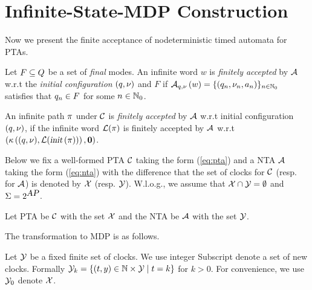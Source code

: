\section{Infinite-State-MDP Construction}

Now we present the finite acceptance of nodeterministic timed automata for PTAs.
\vspace{-0.8em}
\begin{definition}
Let $F\subseteq Q$ be a set of \emph{final} modes.
An infinite word $w$ is \emph{finitely accepted} by $\mathcal{A}$ w.r.t the \emph{initial configuration} $(q,\nu)$ and $F$ if ${\mathcal{A}}_{q,\nu}\left(w\right)=\{(q_n,\nu_n,a_n)\}_{n\in\mathbb{N}_0}$ satisfies that $q_n\in F$ for
some $n\in\mathbb{N}_0$.
\end{definition}

\begin{definition}
An infinite path $\pi$ under $\mathcal{C}$ is \emph{finitely accepted} by $\mathcal{A}$ w.r.t 
initial configuration $(q,\nu)$, if the infinite word $\mathcal{L}(\pi)$ is finitely
accepted by $\mathcal{A}$ w.r.t 
$
\left(\kappa\left((q,\nu), \mathcal{L}(\mbox{\sl init}\left(\pi\right))\right),\mathbf{0}\right)
$.
\end{definition}
% 
% 
Below we fix a well-formed PTA $\mathcal{C}$ taking the form (\ref{eq:pta}) and a NTA $\mathcal{A}$ taking the form (\ref{eq:nta}) with the difference that the set of clocks for $\mathcal{C}$ (resp. for $\mathcal{A}$) is denoted by $\mathcal{X}$ (resp. $\mathcal{Y}$).
W.l.o.g., we assume that $\mathcal{X} \cap \mathcal{Y} = \emptyset$ and $\Sigma=2^{\mbox{\sl AP}}$.

Let PTA be $\mathcal{C}$ with the set $\mathcal{X}$ and the NTA be $\mathcal{A}$ with the set $\mathcal{Y}$.

The transformation to MDP is as follows.

Let $\mathcal{Y}$ be a fixed finite set of clocks. We use integer Subscript denote a set of 
new clocks. Formally
$
    \mathcal{Y}_k = \left \{
        \left (
            t,y
        \right ) \in \mathbb{N} \times \mathcal{Y}
        \mid
        t = k
    \right \}
$ for $ k > 0 $.
For convenience, we use $ \mathcal{Y}_0 $ denote $ \mathcal{X} $.

